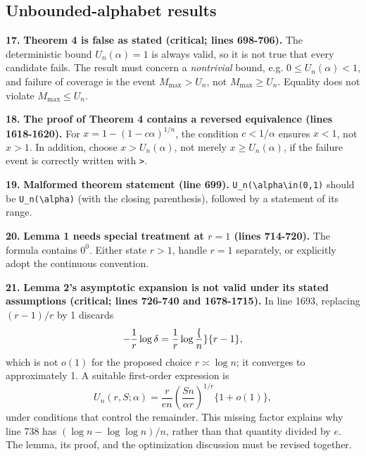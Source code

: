 \documentclass[10pt,a4paper]{article}
\begin{document}
\subsection*{Unbounded-alphabet results}

\par\medskip\noindent\textbf{17.} \textbf{Theorem 4 is false as stated (critical; lines 698-706).} The deterministic bound \(U_n(\alpha)=1\) is always valid, so it is not true that every candidate fails. The result must concern a \emph{nontrivial} bound, e.g. \(0\le U_n(\alpha)<1\), and failure of coverage is the event \(M_{\max}>U_n\), not \(M_{\max}\ge U_n\). Equality does not violate \(M_{\max}\le U_n\).

\par\medskip\noindent\textbf{18.} \textbf{The proof of Theorem 4 contains a reversed equivalence (lines 1618-1620).} For \(x=1-(1-c\alpha)^{1/n}\), the condition \(c<1/\alpha\) ensures \(x<1\), not \(x>1\). In addition, choose \(x>U_n(\alpha)\), not merely \(x\ge U_n(\alpha)\), if the failure event is correctly written with \texttt{>}.

\par\medskip\noindent\textbf{19.} \textbf{Malformed theorem statement (line 699).} \texttt{U\_\allowbreak{}n(\textbackslash{}\allowbreak{}alpha\textbackslash{}\allowbreak{}in(0,1)} should be \texttt{U\_\allowbreak{}n(\textbackslash{}\allowbreak{}alpha)} (with the closing parenthesis), followed by a statement of its range.

\par\medskip\noindent\textbf{20.} \textbf{Lemma 1 needs special treatment at \(r=1\) (lines 714-720).} The formula contains \(0^0\). Either state \(r>1\), handle \(r=1\) separately, or explicitly adopt the continuous convention.

\par\medskip\noindent\textbf{21.} \textbf{Lemma 2's asymptotic expansion is not valid under its stated assumptions (critical; lines 726-740 and 1678-1715).} In line 1693, replacing \((r-1)/r\) by 1 discards
\[-\frac1r\log\delta=\frac1r\log\frac\{n\}\{r-1\},\]
which is not \(o(1)\) for the proposed choice \(r\asymp\log n\); it converges to approximately 1. A suitable first-order expression is
\[
    U_n(r,S;\alpha)
    =\frac{r}{en}\left(\frac{Sn}{\alpha r}\right)^{1/r}\{1+o(1)\},
\]
under conditions that control the remainder. This missing factor explains why line 738 has \((\log n-\log\log n)/n\), rather than that quantity divided by \(e\). The lemma, its proof, and the optimization discussion must be revised together.
\end{document}
